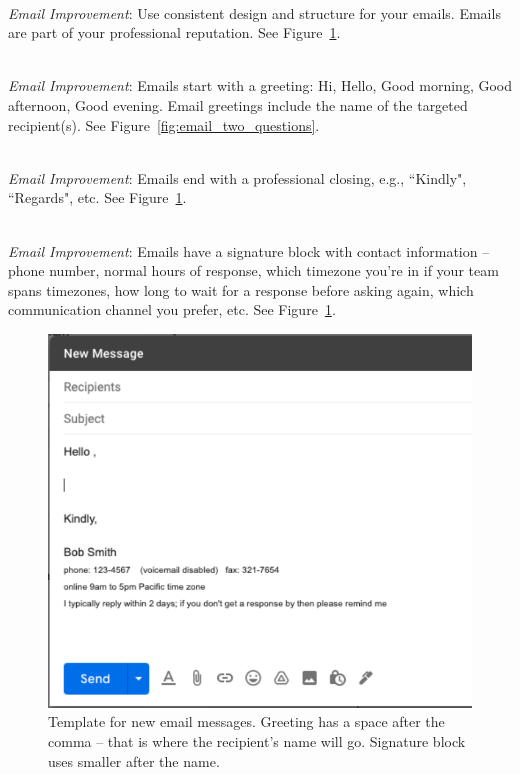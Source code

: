 
\ \\
\textit{Email Improvement}: Use consistent design and structure for your emails. Emails are part of your professional reputation. See Figure~\ref{fig:email_template}.

\ \\
\textit{Email Improvement}: Emails start with a greeting: Hi, Hello, Good morning, Good afternoon, Good evening. 
Email greetings include the name of the targeted recipient(s). See Figure~\ref{fig:email_two_questions}.

\ \\
\textit{Email Improvement}: Emails end with a professional closing, e.g., ``Kindly", ``Regards", etc. See Figure~\ref{fig:email_template}. %

\ \\
\textit{Email Improvement}: Emails have a signature block with contact information -- phone number, normal hours of response, which timezone you're in if your team spans timezones, how long to wait for a response before asking again, which communication channel you prefer, etc. See Figure~\ref{fig:email_template}. %

\begin{figure}%
\includegraphics[width=1\textwidth]{images/email_template.pdf}
\caption{Template for new email messages. Greeting has a space after the comma -- that is where the recipient's name will go. Signature block uses smaller after the name.}
\label{fig:email_template}
\end{figure}

